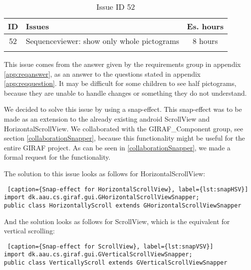 \begin{longtable} { | c | p{12cm} | c | } 
\hline
	ID 	&	Issues	&		 Es. hours \\\hline
	52 	&	Sequenceviewer: show only whole pictograms	&	8 hours \\\hline
\caption{Issue ID 52}
\label{tab:spr3_SVnohalfpictograms}
\end{longtable}

This issue comes from the answer given by the requirements group in appendix \ref{app:reqanswer}, as an answer to the questions stated in appendix \ref{app:reqquestion}. It may be difficult for some children to see half pictograms, because they are unable to handle changes or something they do not understand. 

We decided to solve this issue by using a snap-effect. This snap-effect was to be made as an extension to the already existing android ScrollView and HorizontalScrollView. We collaborated with the GIRAF\_Component group, see section \ref{collaborationSnapper}, because this functionality might be useful for the entire GIRAF project. As can be seen in \ref{collaborationSnapper}, we made a formal request for the functionality.

The solution to this issue looks as follows for HorizontalScrollView:
\begin{lstlisting} [caption={Snap-effect for HorizontalScrollView}, label={lst:snapHSV}]
import dk.aau.cs.giraf.gui.GHorizontalScrollViewSnapper;
public class HorizontallyScroll extends GHorizontalScrollViewSnapper
\end{lstlisting}

And the solution looks as follows for ScrollView, which is the equivalent for vertical scrolling:
\begin{lstlisting} [caption={Snap-effect for ScrollView}, label={lst:snapVSV}]
import dk.aau.cs.giraf.gui.GVerticalScrollViewSnapper;
public class VerticallyScroll extends GVerticalScrollViewSnapper
\end{lstlisting}